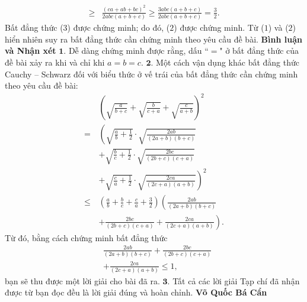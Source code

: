 \begin{multicols}{2}
\begin{align*}
			 \ge &\frac{{{{\left( {ca + ab + bc} \right)}^2}}}{{2abc\left( {a + b + c} \right)}} \ge \frac{{3abc\left( {a \!+\! b \!+\! c} \right)}}{{2abc\left( {a \!+\! b \!+\! c} \right)}} = \frac{3}{2}.
	\end{align*}
	Bất đẳng thức ($3$) được chứng minh; do đó, ($2$) được chứng minh.
	\vskip 0.05cm
	Từ ($1$) và ($2$) hiển nhiên suy ra bất đẳng thức cần chứng minh theo yêu cầu đề bài.
	\vskip 0.05cm
	\textbf{\color{thachthuctoanhoc}Bình luận và Nhận xét}
	\vskip 0.05cm
	$\pmb{1.}$ Dễ dàng chứng minh được rằng, dấu ``$=$" ở bất đẳng thức của đề bài xảy ra khi và chỉ khi $a = b = c$.
	\vskip 0.05cm
	$\pmb{2.}$ Một cách vận dụng khác bất đẳng thức Cauchy -- Schwarz đối với biểu thức ở vế trái của bất đẳng thức cần chứng minh theo yêu cầu đề bài:
	\begin{align*}
			&{\left( {\sqrt {\frac{a}{{b + c}}}  + \sqrt {\frac{b}{{c + a}}}  + \sqrt {\frac{c}{{a + b}}} } \right)^2}\\[-0.5ex]
			=\, &\left( \sqrt {\frac{a}{b} + \frac{1}{2}}  \cdot \sqrt {\frac{{2ab}}{{\left( {2a + b} \right)\left( {b + c} \right)}}}\right.  \\[-0.5ex]
				&+ \sqrt {\frac{b}{c} + \frac{1}{2}}  \cdot \sqrt {\frac{{2bc}}{{\left( {2b + c} \right)\left( {c + a} \right)}}}\\[-0.5ex]
				&\left.+ \sqrt {\frac{c}{a} + \frac{1}{2}}  \cdot \sqrt {\frac{{2ca}}{{\left( {2c + a} \right)\left( {a + b} \right)}}}  \right)^2\\[-0.5ex]
			\le &\left( {\frac{a}{b} + \frac{b}{c} + \frac{c}{a} + \frac{3}{2}} \right)\left( \frac{{2ab}}{{\left( {2a + b} \right)\left( {b + c} \right)}}\right. \\[-0.5ex]
				&\left.+ \frac{{2bc}}{{\left( {2b + c} \right)\left( {c + a} \right)}} + \frac{{2ca}}{{\left( {2c + a} \right)\left( {a + b} \right)}} \right).
	\end{align*}
	Từ đó, bằng cách chứng minh bất đẳng thức
	\begin{align*}
		&\frac{{2ab}}{{\left( {2a + b} \right)\left( {b + c} \right)}} + \frac{{2bc}}{{\left( {2b + c} \right)\left( {c + a} \right)}} \\[-0.5ex]
		&+ \frac{{2ca}}{{\left( {2c + a} \right)\left( {a + b} \right)}} \le 1,
	\end{align*}
	bạn sẽ thu được một lời giải cho bài đã ra.
	\vskip 0.05cm
	$\pmb{3.}$ Tất cả các lời giải Tạp chí đã nhận được từ bạn đọc đều là lời giải đúng và hoàn chỉnh.
	\vskip 0.15cm
	\hfill\textbf{\color{thachthuctoanhoc}Võ Quốc Bá Cẩn}
	\vskip 0.05cm
	{}

\end{multicols}
